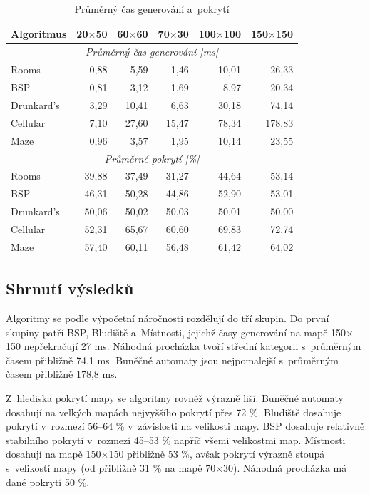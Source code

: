 \documentclass[
   program=itk,
   biblatex,
   figures=true,
   tables=true,
   glossaries,
   index
]{kidiplom}
\begin{document}
\begin{table}[H]
\centering
\small
\begin{tabular}{|l|r|r|r|r|r|}
\hline
\textbf{Algoritmus} & \textbf{20$\times$50} & \textbf{60$\times$60} & \textbf{70$\times$30} & \textbf{100$\times$100} & \textbf{150$\times$150} \\
\hline
\multicolumn{6}{|c|}{\textit{Průměrný čas generování [ms]}} \\
\hline
Rooms    & 0,88  & 5,59  & 1,46  & 10,01  & 26,33  \\
BSP      & 0,81  & 3,12  & 1,69  & 8,97   & 20,34  \\
Drunkard's  & 3,29  & 10,41 & 6,63  & 30,18  & 74,14  \\
Cellular & 7,10  & 27,60 & 15,47 & 78,34  & 178,83 \\
Maze     & 0,96  & 3,57  & 1,95  & 10,14  & 23,55  \\
\hline
\multicolumn{6}{|c|}{\textit{Průměrné pokrytí [\%]}} \\
\hline
Rooms    & 39,88 & 37,49 & 31,27 & 44,64 & 53,14 \\
BSP      & 46,31 & 50,28 & 44,86 & 52,90 & 53,01 \\
Drunkard's  & 50,06 & 50,02 & 50,03 & 50,01 & 50,00 \\
Cellular & 52,31 & 65,67 & 60,60 & 69,83 & 72,74 \\
Maze     & 57,40 & 60,11 & 56,48 & 61,42 & 64,02 \\
\hline
\end{tabular}
\caption{Průměrný čas generování a~pokrytí}
\label{tab:results_summary}
\end{table}


\subsection{Shrnutí výsledků}

Algoritmy se podle výpočetní náročnosti rozdělují do tří skupin. Do první skupiny patří BSP, Bludiště a~Místnosti, jejichž časy generování na mapě 150$\times$150 nepřekračují 27 ms. Náhodná procházka tvoří střední kategorii s~průměrným časem přibližně 74,1 ms. Buněčné automaty jsou nejpomalejší s~průměrným časem přibližně 178,8 ms.

Z~hlediska pokrytí mapy se algoritmy rovněž výrazně liší. Buněčné automaty dosahují na velkých mapách nejvyššího pokrytí přes 72 \%. Bludiště dosahuje pokrytí v~rozmezí 56--64 \% v~závislosti na velikosti mapy. BSP dosahuje relativně stabilního pokrytí v~rozmezí 45--53 \% napříč všemi velikostmi map. Místnosti dosahují na mapě 150$\times$150 přibližně 53 \%, avšak pokrytí výrazně stoupá s~velikostí mapy (od přibližně 31 \% na mapě 70$\times$30). Náhodná procházka má dané pokrytí 50 \%.
\end{document}
